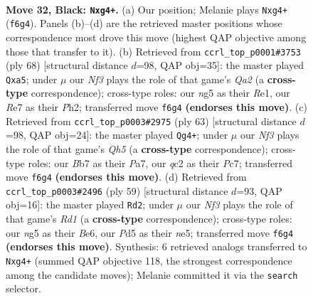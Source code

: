 \documentclass[11pt]{article}
\begin{document}
\clearpage

\begin{figure}[p]\centering
\begin{subfigure}{0.46\textwidth}\centering
\resizebox{\linewidth}{!}{%
\newchessgame
\chessboard[
  setfen={4rk2/Nb2rp2/qp3n2/3p2NP/P2P2B1/6R1/2Q2K2/7R b - - 0 32},
  showmover=false,
  pgfstyle=straightmove, color=movearrow, markmove={f6-g4}
]}
\caption{}
\end{subfigure}\hfill
\begin{subfigure}{0.46\textwidth}\centering
\resizebox{\linewidth}{!}{%
\newchessgame
\chessboard[
  setfen={2r3k1/5p1p/1q4p1/p7/2rNnB2/4P3/Q1b2PPP/R3R2K w - - 2 35},
  showmover=false,
  pgfstyle=straightmove, color=movearrow, markmove={a2-a5}
]}
\caption{}
\end{subfigure}
\\[4pt]
\begin{subfigure}{0.46\textwidth}\centering
\resizebox{\linewidth}{!}{%
\newchessgame
\chessboard[
  setfen={3r3r/p1pk2pp/2n5/6P1/5P1q/B1Q1P3/B5K1/5R2 b - - 4 32},
  showmover=false,
  pgfstyle=straightmove, color=movearrow, markmove={h4-g4}
]}
\caption{}
\end{subfigure}\hfill
\begin{subfigure}{0.46\textwidth}\centering
\resizebox{\linewidth}{!}{%
\newchessgame
\chessboard[
  setfen={3r1rk1/6p1/4b2p/4Np2/1q3n2/7P/2Q2PP1/2R1RBK1 b - - 0 30},
  showmover=false,
  pgfstyle=straightmove, color=movearrow, markmove={d8-d2}
]}
\caption{}
\end{subfigure}
\caption{\textbf{Move 32, Black: \texttt{Nxg4+}.} (a) Our position; Melanie plays \texttt{Nxg4+} (\texttt{f6g4}). Panels (b)--(d) are the retrieved master positions whose correspondence most drove this move (highest QAP objective among those that transfer to it). (b) Retrieved from \texttt{ccrl\_top\_p0001\#3753} (ply 68) [structural distance $d$=98, QAP obj=35]: the master played \texttt{Qxa5}; under $\mu$ our \emph{Nf3} plays the role of that game's \emph{Qa2} (a \textbf{cross-type} correspondence); cross-type roles: our \emph{n}g5 as their \emph{R}e1, our \emph{R}e7 as their \emph{P}h2; transferred move \texttt{f6g4} \textbf{(endorses this move)}. (c) Retrieved from \texttt{ccrl\_top\_p0003\#2975} (ply 63) [structural distance $d$=98, QAP obj=24]: the master played \texttt{Qg4+}; under $\mu$ our \emph{Nf3} plays the role of that game's \emph{Qh5} (a \textbf{cross-type} correspondence); cross-type roles: our \emph{B}b7 as their \emph{P}a7, our \emph{q}c2 as their \emph{P}c7; transferred move \texttt{f6g4} \textbf{(endorses this move)}. (d) Retrieved from \texttt{ccrl\_top\_p0003\#2496} (ply 59) [structural distance $d$=93, QAP obj=16]: the master played \texttt{Rd2}; under $\mu$ our \emph{Nf3} plays the role of that game's \emph{Rd1} (a \textbf{cross-type} correspondence); cross-type roles: our \emph{n}g5 as their \emph{B}e6, our \emph{P}d5 as their \emph{n}e5; transferred move \texttt{f6g4} \textbf{(endorses this move)}. Synthesis: 6 retrieved analogs transferred to \texttt{Nxg4+} (summed QAP objective 118, the strongest correspondence among the candidate moves); Melanie committed it via the \texttt{search} selector.}
\label{fig:thought-m63}
\end{figure}
\end{document}
